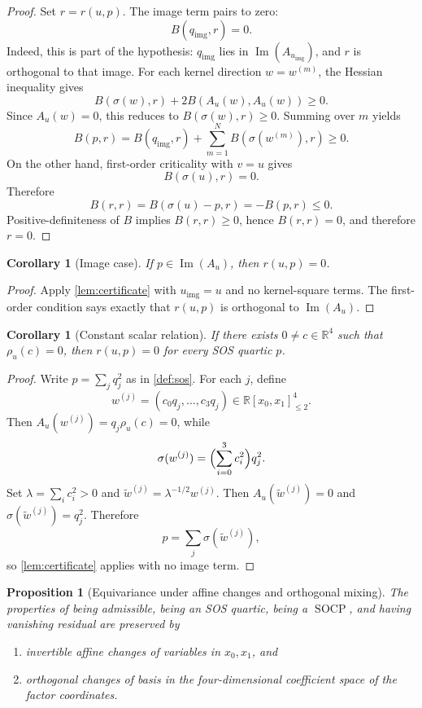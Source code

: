 \documentclass[10pt]{article}
\newtheorem{proposition}[theorem]{Proposition}
\newtheorem{corollary}[theorem]{Corollary}
\theoremstyle{definition}
\newcommand{\R}{\mathbb{R}}
\newcommand{\Poly}{\R[x_0,x_1]}
\newcommand{\Quad}{\Poly_{\le 2}}
\DeclareMathOperator{\imag}{Im}
\newcommand{\im}{\imag}
\newcommand{\SOCP}{\operatorname{SOCP}}
\newcommand{\sig}{\sigma}
\newcommand{\rel}{\rho}
\begin{document}
\begin{proof}
Set \(r=r(u,p)\). The image term pairs to zero:
\[
  B(q_{\mathrm{img}},r)=0.
\]
Indeed, this is part of the hypothesis: \(q_{\mathrm{img}}\) lies in
\(\im(A_{u_{\mathrm{img}}})\), and \(r\) is orthogonal to that image.
For each kernel direction \(w=w^{(m)}\), the Hessian inequality gives
\[
  B(\sig(w),r)+2B(A_u(w),A_u(w))\ge 0.
\]
Since \(A_u(w)=0\), this reduces to \(B(\sig(w),r)\ge 0\). Summing over
\(m\) yields
\[
  B(p,r)=B(q_{\mathrm{img}},r)+\sum_{m=1}^N B(\sig(w^{(m)}),r)\ge 0.
\]
On the other hand, first-order criticality with \(v=u\) gives
\[
  B(\sig(u),r)=0.
\]
Therefore
\[
  B(r,r)=B(\sig(u)-p,r)=-B(p,r)\le 0.
\]
Positive-definiteness of \(B\) implies \(B(r,r)\ge 0\), hence \(B(r,r)=0\),
and therefore \(r=0\).
\end{proof}

\begin{corollary}[Image case]\label{cor:image}
If \(p\in \im(A_u)\), then \(r(u,p)=0\).
\end{corollary}

\begin{proof}
Apply \cref{lem:certificate} with \(u_{\mathrm{img}}=u\) and no kernel-square
terms. The first-order condition says exactly that \(r(u,p)\) is orthogonal to
\(\im(A_u)\).
\end{proof}

\begin{corollary}[Constant scalar relation]
\label{cor:constant-relation}
If there exists \(0\neq c\in \R^4\) such that \(\rel_u(c)=0\), then
\(r(u,p)=0\) for every SOS quartic \(p\).
\end{corollary}

\begin{proof}
Write \(p=\sum_j q_j^2\) as in \cref{def:sos}. For each \(j\), define
\[
  w^{(j)}=(c_0 q_j,\dots,c_3 q_j)\in \Quad^4.
\]
Then \(A_u(w^{(j)})=q_j\rel_u(c)=0\), while
\[
  \sig(w^{(j)})=\Bigl(\sum_{i=0}^3 c_i^2\Bigr)q_j^2.
\]
Set \(\lambda=\sum_i c_i^2>0\) and \(\widetilde w^{(j)}=\lambda^{-1/2}w^{(j)}\).
Then \(A_u(\widetilde w^{(j)})=0\) and \(\sig(\widetilde w^{(j)})=q_j^2\).
Therefore
\[
  p=\sum_j \sig(\widetilde w^{(j)}),
\]
so \cref{lem:certificate} applies with no image term.
\end{proof}

\begin{proposition}[Equivariance under affine changes and orthogonal mixing]
\label{prop:equivariance}
The properties of being admissible, being an SOS quartic, being a \(\SOCP\),
and having vanishing residual are preserved by
\begin{enumerate}
\item invertible affine changes of variables in \(x_0,x_1\), and
\item orthogonal changes of basis in the four-dimensional coefficient space of
the factor coordinates.
\end{enumerate}
\end{proposition}
\end{document}
